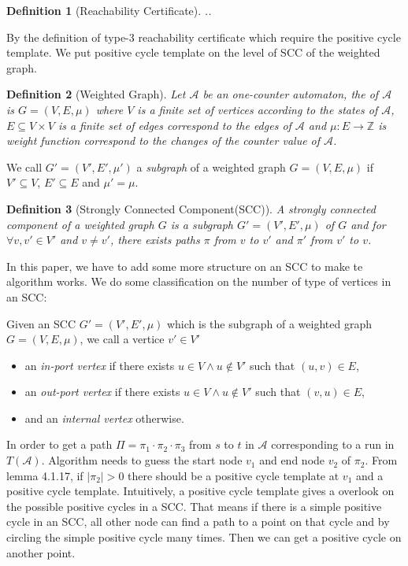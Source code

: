 \documentclass{article}
\newtheorem{definition}{Definition}
\begin{document}
\begin{definition}[Reachability Certificate]
..
\end{definition}

By the definition of type-3 reachability certificate which require the positive cycle template. We put positive cycle template on the level of SCC of the weighted graph.


\begin{definition}[Weighted Graph]
Let $\mathcal{A}$ be an one-counter automaton, the  of $\mathcal{A}$ is $G = (V,E,\mu)$ where $V$ is a finite set of vertices according to the states of $\mathcal{A}$, $E\subseteq V\times V$ is a finite set of edges correspond to the edges of $\mathcal{A}$ and $\mu : E\rightarrow \mathbb{Z}$ is weight function correspond to the changes of the counter value of $\mathcal{A}$.
\end{definition}

We call $G' = (V', E', \mu')$ a \textit{subgraph} of a weighted graph $G = (V, E, \mu)$ if $V'\subseteq V$, $E'\subseteq E$ and $\mu' = \mu$.

\begin{definition}[Strongly Connected Component(SCC)]
A strongly connected component of a weighted graph $G$ is a subgraph $G' = (V', E', \mu)$ of $G$ and for $\forall v, v'\in V'$ and $v \ne v'$, there exists paths $\pi$ from $v$ to $v'$ and $\pi'$ from $v'$ to $v$.


\end{definition}

In this paper, we have to add some more structure on an SCC to make te algorithm works. We do some classification on the number of type of vertices in an SCC:

Given an SCC $G' = (V', E', \mu)$ which is the subgraph of a weighted graph $G = (V, E, \mu)$, we call a vertice $v'\in V'$ 

\begin{itemize}
\item an \textit{in-port vertex} if there exists $u \in V \wedge u \notin V'$ such that $(u,v) \in E$,
\item an \textit{out-port vertex} if there exists $u \in V \wedge u \notin V'$ such that $(v,u) \in E$,
\item and an \textit{internal vertex} otherwise.
\end{itemize}



In order to get a path $\Pi= \pi_1\cdot \pi_2 \cdot \pi_3$ from $s$ to $t$ in   $\mathcal{A}$ corresponding to a run in $T(\mathcal{A})$. Algorithm needs to guess the start node $v_1$ and end node $v_2$ of $\pi_2$. From lemma 4.1.17, if $|\pi_2| > 0$ there should be a  positive cycle template at $v_1$ and a positive cycle template. Intuitively, a positive cycle template gives a overlook on the possible positive cycles in a SCC. That means if there is a simple positive cycle in an SCC, all other node can find a path to a point on that cycle and by circling the simple positive cycle many times. Then we can get a positive cycle on another point.
\end{document}
